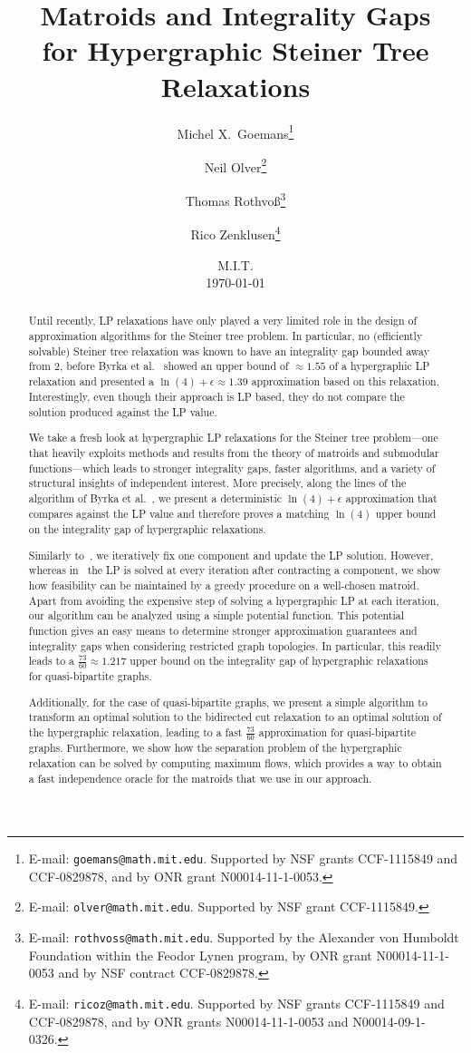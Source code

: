 \documentclass[11pt, letterpaper]{article}
\title{Matroids and Integrality Gaps \\
for Hypergraphic Steiner Tree Relaxations}
\date{M.I.T. \\[1.5em] \today}
\author{Michel X.~Goemans\thanks{E-mail: {\tt goemans@math.mit.edu}. Supported by NSF grants CCF-1115849 and CCF-0829878, and by
ONR grant N00014-11-1-0053.}
\and Neil Olver\thanks{E-mail: {\tt olver@math.mit.edu}. Supported by NSF grant CCF-1115849.}
\and Thomas Rothvo\ss\thanks{E-mail: {\tt rothvoss@math.mit.edu}. Supported by the Alexander von Humboldt Foundation within the Feodor Lynen program, by ONR grant N00014-11-1-0053 and by NSF contract
CCF-0829878.}
\and Rico Zenklusen\thanks{E-mail: {\tt ricoz@math.mit.edu}.
Supported by NSF grants CCF-1115849 and CCF-0829878, and by
ONR grants N00014-11-1-0053 and N00014-09-1-0326.
}}
\theoremstyle{definition}
\begin{document}
\begin{titlepage}
\maketitle
\thispagestyle{empty}
\begin{abstract}


Until recently, LP relaxations have only played a very limited role in
the design of approximation algorithms for the Steiner tree problem.
In particular, no (efficiently solvable) Steiner tree
relaxation was known to have an integrality gap bounded away from $2$,
before Byrka et al.~\cite{byrka_2011_steiner} showed an upper bound
of $\approx 1.55$ of a hypergraphic LP relaxation 
and presented a $\ln(4)+\epsilon\approx 1.39$ approximation based
on this relaxation.
Interestingly, even though their approach is LP based, they do not
compare the solution produced against the LP value. 

We take a fresh look at hypergraphic LP relaxations
for the Steiner tree problem---one that heavily exploits methods
and results from the theory of matroids and submodular
functions---which leads 
to stronger integrality gaps, faster algorithms, and a variety of
structural insights of independent interest.
More precisely, along the lines of the algorithm of Byrka et
al.~\cite{byrka_2011_steiner}, we present a deterministic
$\ln(4)+\epsilon$ approximation that compares against the LP value and
therefore proves a matching $\ln(4)$ upper bound on the
integrality gap of hypergraphic relaxations.

Similarly to~\cite{byrka_2011_steiner}, we
iteratively fix one component and update the LP solution.
However, whereas in~\cite{byrka_2011_steiner} the 
LP is solved at every iteration after contracting a
component, we show how feasibility can be maintained by
a greedy procedure on a well-chosen matroid.
Apart from avoiding the expensive step of solving a hypergraphic
LP at each iteration, our algorithm can be analyzed
using a simple potential function.
This potential function gives an easy means
to determine stronger approximation guarantees and integrality
gaps when considering
restricted graph topologies.
In particular, this readily leads to a $\frac{73}{60}\approx 1.217$
upper bound on the integrality gap of hypergraphic relaxations
for quasi-bipartite graphs.

Additionally, for the case of quasi-bipartite graphs,
we present a simple algorithm to transform
an optimal solution to the bidirected cut relaxation
to an optimal solution of the hypergraphic relaxation,
leading to a fast $\frac{73}{60}$ approximation
for quasi-bipartite graphs.
Furthermore, we show how the separation problem of the hypergraphic
relaxation can be solved by computing maximum flows, which provides a
way to obtain a fast independence oracle for the matroids that we use
in our approach.  

\end{abstract}



\end{titlepage}
\end{document}
